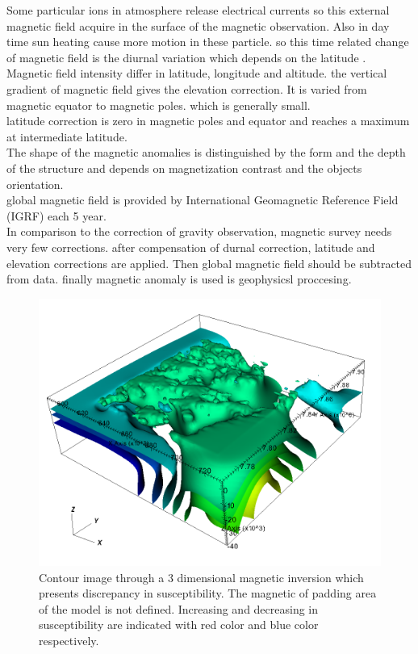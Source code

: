 Some particular ions in atmosphere release electrical currents so this external magnetic field acquire in the surface of the magnetic observation. Also in day time sun heating cause more motion in these particle. so this time related change of magnetic field is the diurnal variation which depends on the latitude . \\
Magnetic field intensity differ in latitude, longitude and altitude. the vertical gradient of magnetic field gives the elevation correction. It is varied from magnetic equator to magnetic poles. which is generally small.\\
latitude correction is zero in magnetic poles and equator and reaches a maximum at intermediate latitude.\\
The shape of the magnetic anomalies is distinguished by the form and the depth of the structure and depends on magnetization contrast and the objects orientation.\\
global magnetic field is provided by International Geomagnetic Reference Field (IGRF) each 5 year.\\

In comparison to the correction of gravity observation, magnetic survey needs very few corrections. after compensation of durnal correction, latitude and elevation corrections are applied. Then global magnetic field should be subtracted from data. finally magnetic anomaly is used is geophysicsl proccesing.\\

\begin{figure}
\centering
\includegraphics[width=\textwidth]{sus3Dc.png}
\caption{Contour image through a 3 dimensional magnetic inversion which presents discrepancy in susceptibility. The magnetic of padding area of the model is not defined. Increasing and decreasing in susceptibility are indicated with red color and blue color respectively.}
\end{figure}

